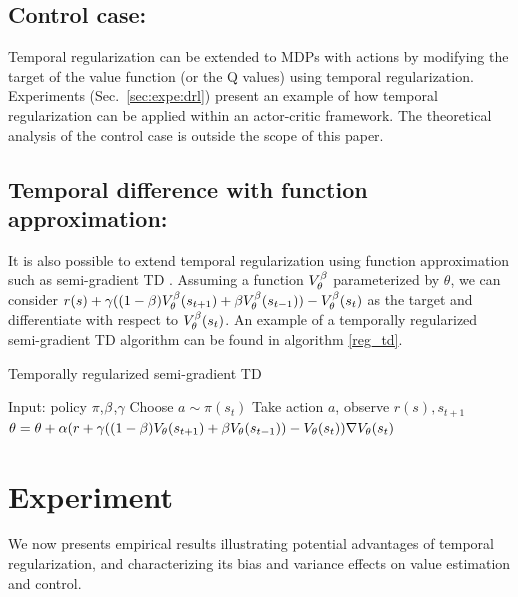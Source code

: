 \subsection{Control case:} 
Temporal regularization can be extended to MDPs with actions by  modifying the target of the value function (or the Q values) using temporal regularization. Experiments (Sec.~\ref{sec:expe:drl}) present an example of how temporal regularization can be applied within an actor-critic framework. The theoretical analysis of the control case is outside the scope of this paper.

\subsection{Temporal difference with function approximation:}
It is also possible to extend temporal regularization using function approximation such as  semi-gradient TD \cite{sutton2017reinforcement}. 
Assuming a function $V_{\theta}^{\beta}$ parameterized by $\theta$, we can consider $r(s) + \gamma ((1-\beta)V_{\theta}^{\beta}(s_{t+1}) + \beta V_{\theta}^{\beta}(s_{t-1})) - V_{\theta}^{\beta}(s_t)$  as the target and differentiate with respect to $V_{\theta}^{\beta}(s_{t})$. An example of a temporally regularized semi-gradient TD algorithm can be found in algorithm \ref{reg_td}.

\begin{algorithm}[H]
\caption{Temporally regularized semi-gradient TD}
\begin{algorithmic}[1]
	\label{reg_td}
    \STATE Input: policy $\pi$,$\beta$,$\gamma$
        \STATE Choose $a \sim \pi(s_t)$
        \STATE Take action $a$, observe $r(s),s_{t+1}$
        \STATE $\theta = \theta + \alpha (r + \gamma((1-\beta) V_{\theta}(s_{t+1}) + \beta V_{\theta}(s_{t-1})) - V_{\theta}(s_t))\nabla V_{\theta}(s_{t}) $
    \ENDFOR
\end{algorithmic}
\end{algorithm}


\section{Experiment}
We now presents empirical results illustrating potential advantages of temporal regularization, and characterizing its bias and variance effects on value estimation and control.




